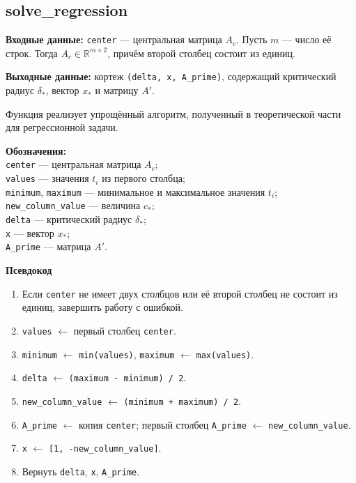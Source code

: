 \documentclass[12pt,a4paper]{article}
\numberwithin{equation}{section}
\newcommand{\theorypart}[1]{%
    \par\medskip
    \noindent\textbf{#1}\par\nopagebreak\smallskip
}
\begin{document}
\subsection{solve\_regression}

\noindent
\textbf{Входные данные:} \texttt{center} --- центральная матрица
$A_c$. Пусть $m$ --- число её строк. Тогда
$A_c\in\mathbb{R}^{m\times2}$, причём второй столбец состоит из единиц.

\noindent
\textbf{Выходные данные:} кортеж \texttt{(delta, x, A\_prime)}, содержащий
критический радиус $\delta_*$, вектор $x_*$ и матрицу $A'$.

\medskip
\noindent
Функция реализует упрощённый алгоритм, полученный в теоретической части
для регрессионной задачи.

\smallskip
\noindent
\textbf{Обозначения:}\\
\texttt{center} --- центральная матрица $A_c$;\\
\texttt{values} --- значения $t_i$ из первого столбца;\\
\texttt{minimum}, \texttt{maximum} --- минимальное и максимальное
значения $t_i$;\\
\texttt{new\_column\_value} --- величина $c_*$;\\
\texttt{delta} --- критический радиус $\delta_*$;\\
\texttt{x} --- вектор $x_*$;\\
\texttt{A\_prime} --- матрица $A'$.

\theorypart{Псевдокод}

\begin{enumerate}
    \setlength{\itemsep}{0.3\baselineskip}
    \item Если \texttt{center} не имеет двух столбцов или её второй
    столбец не состоит из единиц, завершить работу с ошибкой.
    \item \texttt{values} $\gets$ первый столбец \texttt{center}.
    \item \texttt{minimum} $\gets$ \texttt{min(values)},
    \texttt{maximum} $\gets$ \texttt{max(values)}.
    \item \texttt{delta} $\gets$
    \texttt{(maximum - minimum) / 2}.
    \item \texttt{new\_column\_value} $\gets$
    \texttt{(minimum + maximum) / 2}.
    \item \texttt{A\_prime} $\gets$ копия \texttt{center};
    первый столбец \texttt{A\_prime} $\gets$
    \texttt{new\_column\_value}.
    \item \texttt{x} $\gets$ \texttt{[1, -new\_column\_value]}.
    \item Вернуть \texttt{delta}, \texttt{x}, \texttt{A\_prime}.
\end{enumerate}
\end{document}
